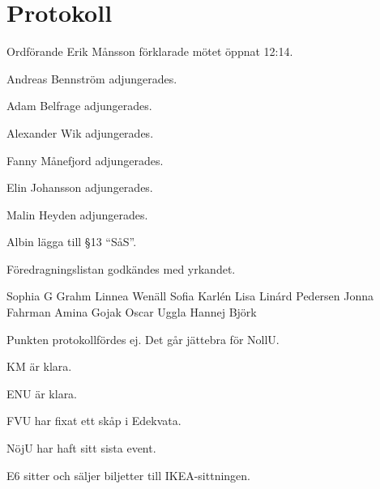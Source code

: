 \documentclass[10pt]{article}
\def\mo{Erik Månsson}
\begin{document}
\section*{Protokoll}
\begin{paragrafer}
Ordförande {\mo} förklarade mötet öppnat 12:14.

{\valavmo}

{\valavms}

{\valavj}

{\tosg}

Andreas Bennström adjungerades.

Adam Belfrage adjungerades.

Alexander Wik  adjungerades.

Fanny Månefjord  adjungerades.

Elin Johansson adjungerades.

Malin Heyden  adjungerades.


Albin \ypa lägga till \S13 ``SåS''.

Föredragningslistan godkändes med yrkandet.


\begin{fyllnadsval} %
Sophia G Grahm
Linnea Wenäll
Sofia Karlén
Lisa Linárd Pedersen
Jonna Fahrman
Amina Gojak
Oscar Uggla
Hannej Björk
\end{fyllnadsval}

\begin{paragrafer}
Punkten protokollfördes ej.
Det går jättebra för NollU.

KM är klara.

ENU är klara.

FVU har fixat ett skåp i Edekvata.

NöjU har haft sitt sista event.

E6 sitter och säljer biljetter till IKEA-sittningen.


\end{paragrafer}
\end{paragrafer}
\end{document}
